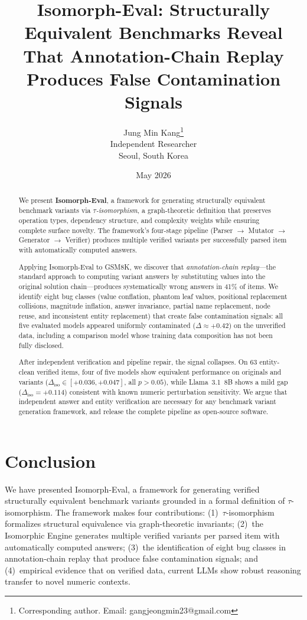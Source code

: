 \documentclass[11pt,a4paper]{article}
\title{Isomorph-Eval: Structurally Equivalent Benchmarks Reveal\\
That Annotation-Chain Replay Produces False Contamination Signals}
\author{Jung Min Kang\thanks{Corresponding author. Email: gangjeongmin23@gmail.com}\\
Independent Researcher\\
Seoul, South Korea}
\date{May 2026}
\begin{document}
\maketitle

\begin{abstract}
We present \textbf{Isomorph-Eval}, a framework for generating
structurally equivalent benchmark variants via \emph{$\tau$-isomorphism},
a graph-theoretic definition that preserves operation types, dependency
structure, and complexity weights while ensuring complete surface
novelty. The framework's four-stage pipeline (Parser $\to$ Mutator
$\to$ Generator $\to$ Verifier) produces multiple verified variants
per successfully parsed item with automatically computed answers.

Applying Isomorph-Eval to GSM8K, we discover that
\emph{annotation-chain replay}---the standard approach to computing
variant answers by substituting values into the original solution
chain---produces systematically wrong answers in 41\% of items. We
identify eight bug classes (value conflation, phantom leaf values,
positional replacement collisions, magnitude inflation, answer
invariance, partial name replacement, node reuse, and inconsistent
entity replacement) that create
false contamination signals: all five evaluated models appeared
uniformly contaminated ($\Delta \approx +0.42$) on the unverified
data, including a comparison model whose training data composition
has not been fully disclosed.

After independent verification and pipeline repair, the signal
collapses. On 63 entity-clean verified items, four of five models show equivalent
performance on originals and variants
($\Delta_{\mathrm{iso}} \in [+0.036, +0.047]$, all $p > 0.05$),
while Llama~3.1~8B shows a mild gap
($\Delta_{\mathrm{iso}} = +0.114$) consistent with known numeric
perturbation sensitivity. We argue that independent answer and entity
verification are necessary for any benchmark variant generation
framework, and release the complete pipeline as open-source software.
\end{abstract}





\section{Conclusion}
\label{sec:conclusion}

We have presented Isomorph-Eval, a framework for generating verified
structurally equivalent benchmark variants grounded in a formal
definition of $\tau$-isomorphism. The framework makes four
contributions: (1)~$\tau$-isomorphism formalizes structural equivalence
via graph-theoretic invariants; (2)~the Isomorphic Engine generates
multiple verified variants per parsed item with automatically
computed answers;
(3)~the identification of eight bug classes in annotation-chain replay
that produce false contamination signals; and (4)~empirical evidence
that on verified data, current LLMs show robust reasoning transfer to
novel numeric contexts.
\end{document}

